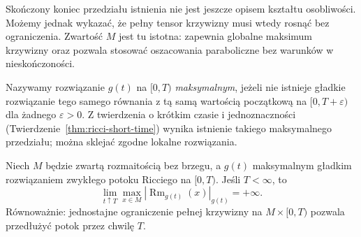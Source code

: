 Skończony koniec przedziału istnienia nie jest jeszcze
opisem kształtu osobliwości. Możemy jednak wykazać,
że pełny tensor krzywizny musi wtedy rosnąć bez
ograniczenia. Zwartość $M$ jest tu istotna:
zapewnia globalne maksimum krzywizny oraz
pozwala stosować oszacowania paraboliczne bez
warunków w nieskończoności.

Nazywamy rozwiązanie $g(t)$ na $[0,T)$
\emph{maksymalnym}, jeżeli nie istnieje gładkie
rozwiązanie tego samego równania z tą samą
wartością początkową na $[0,T+\varepsilon)$
dla żadnego $\varepsilon>0$. Z twierdzenia o
krótkim czasie i jednoznaczności
(Twierdzenie~\ref{thm:ricci-short-time})
wynika istnienie takiego maksymalnego przedziału;
można sklejać zgodne lokalne rozwiązania.

\begin{twierdzenie}
\label{thm:ricci-continuation}
Niech $M$ będzie zwartą rozmaitością bez brzegu,
a $g(t)$ maksymalnym gładkim rozwiązaniem
zwykłego potoku Ricciego na $[0,T)$.
Jeśli $T<\infty$, to
\begin{equation}\label{eq:ricci-continuation}
 \lim_{t\uparrow T}\max_{x\in M}
       |\operatorname{Rm}_{g(t)}(x)|_{g(t)}
 =+\infty.
\end{equation}
Równoważnie: jednostajne ograniczenie pełnej
krzywizny na $M\times[0,T)$ pozwala przedłużyć
potok przez chwilę $T$.
\end{twierdzenie}
